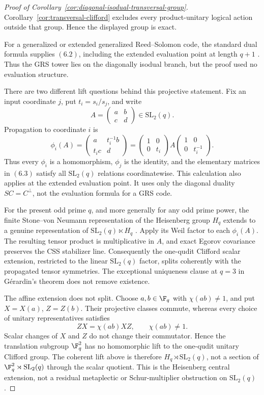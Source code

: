 \begin{proof}[Proof of
Corollary~\ref{cor:diagonal-isodual-transversal-group}]
Corollary~\ref{cor:transversal-clifford} excludes every product-unitary
logical action outside that group.  Hence the displayed group is exact.

For a generalized or extended generalized Reed--Solomon code, the
standard dual formula supplies \((6.2)\), including the extended
evaluation point at length \(q+1\)
\cite[Sections~5.2--5.3]{HuffmanPless2003}.  Thus the GRS tower lies on the
diagonally isodual branch, but the proof used no evaluation structure.

There are two different lift questions behind this projective statement.
Fix an input coordinate \(j\), put \(t_i=s_i/s_j\), and write
\[
 A=\begin{pmatrix}a&b\\c&d\end{pmatrix}\in\mathrm{SL}_2(q).
\]
Propagation to coordinate \(i\) is
\[
 \phi_i(A)=
 \begin{pmatrix}a&t_i^{-1}b\\t_i c&d\end{pmatrix}
 =
 \begin{pmatrix}1&0\\0&t_i\end{pmatrix}
 A
 \begin{pmatrix}1&0\\0&t_i^{-1}\end{pmatrix}.          \tag{6.4}
\]
Thus every \(\phi_i\) is a homomorphism, \(\phi_j\) is the identity,
and the elementary matrices in \((6.3)\) satisfy all
\(\mathrm{SL}_2(q)\) relations coordinatewise.  This calculation also
applies at the extended evaluation point.  It uses only the diagonal
duality \(SC=C^\perp\), not the evaluation formula for a GRS code.

For the present odd prime \(q\), and more generally for any odd prime
power, the finite Stone--von Neumann representation of the Heisenberg
group \(H_q\) extends to a genuine representation of
\(\mathrm{SL}_2(q)\ltimes H_q\)
\cite[Theorem~1]{Gerardin1976}.  Apply its Weil factor to each
\(\phi_i(A)\).  The resulting tensor product is multiplicative in
\(A\), and exact Egorov covariance preserves the CSS stabilizer line.
Consequently the one-qudit Clifford scalar extension, restricted to the
linear \(\mathrm{SL}_2(q)\) factor, splits coherently with the propagated
tensor symmetries.  The exceptional uniqueness clause at \(q=3\) in
G\'erardin's theorem does not remove existence.

The affine extension does not split.  Choose \(a,b\in\F_q\) with
\(\chi(ab)\ne1\), and put \(X=X(a)\), \(Z=Z(b)\).  Their projective
classes commute, whereas every choice of unitary representatives
satisfies
\[
 ZX=\chi(ab)XZ,\qquad \chi(ab)\ne1 .
\]
Scalar changes of \(X\) and \(Z\) do not change their commutator.
Hence the translation subgroup
\(\F_q^2\) has no homomorphic lift to the one-qudit unitary Clifford
group.  The coherent lift above is therefore
\(H_q\rtimes\mathrm{SL}_2(q)\), not a section of
\(\F_q^2\rtimes\mathrm{SL}_2(q)\) through the scalar quotient.
This is the Heisenberg central extension, not a residual metaplectic
or Schur-multiplier obstruction on \(\mathrm{SL}_2(q)\).


\end{proof}
